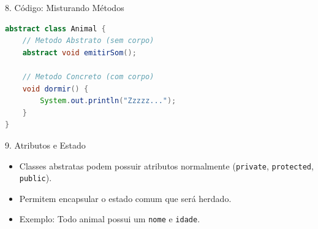 \documentclass[9pt]{beamer}
\begin{document}
\begin{frame}[fragile]{8. Código: Misturando Métodos}
\begin{lstlisting}[language=Java]
abstract class Animal {
    // Metodo Abstrato (sem corpo)
    abstract void emitirSom();

    // Metodo Concreto (com corpo)
    void dormir() {
        System.out.println("Zzzzz...");
    }
}
\end{lstlisting}
\end{frame}

\begin{frame}{9. Atributos e Estado}
    \begin{itemize}
        \item Classes abstratas podem possuir atributos normalmente (\texttt{private}, \texttt{protected}, \texttt{public}).
        \item Permitem encapsular o estado comum que será herdado.
        \item Exemplo: Todo animal possui um \texttt{nome} e \texttt{idade}.
    \end{itemize}
\end{frame}
\end{document}
